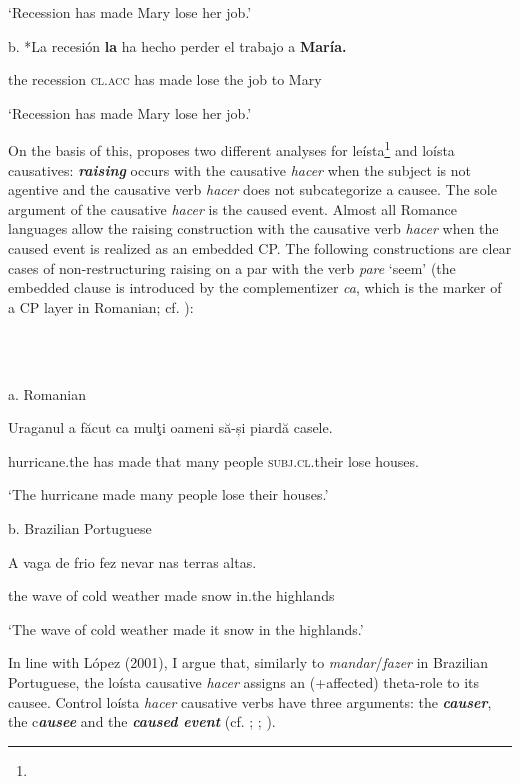 \documentclass[output=paper]{langsci/langscibook}
\begin{document}
‘Recession has made Mary lose her job.’

b.  *La recesión  \textbf{la}          ha  hecho perder el  trabajo  a  \textbf{María.}   

the  recession \textsc{cl.acc} has made  lose    the job       to Mary

‘Recession has made Mary lose her job.’

On the basis of this, \citet{Torrego2010} proposes two different analyses for leísta\footnote{} and loísta causatives: \textbf{\textit{raising}} occurs with the causative \textit{hacer} when the subject is not agentive and the causative verb \textit{hacer} does not subcategorize a causee. The sole argument of the causative \textit{hacer} is the caused event. Almost all Romance languages allow the raising construction with the causative verb \textit{hacer} when the caused event is realized as an embedded CP. The following constructions are clear cases of non-restructuring raising on a par with the verb \textit{pare} ‘seem’ (the embedded clause is introduced by the complementizer \textit{ca}, which is the marker of a CP layer in Romanian; cf. \citealt{Alboiu2007}):

\ea%
    \label{ex:key:8}
    \gll\\
        \\
    \glt
    \z

          a.  Romanian

Uraganul    a    făcut   ca   mulţi  oameni  să-și              piardă casele.   

    hurricane.the has made  that many people   \textsc{subj.cl}.their lose     houses. 

    ‘The hurricane made many people lose their houses.’

  b.  Brazilian Portuguese

A   vaga  de frio     fez   nevar   nas     terras altas.  

    the wave of cold weather   made  snow  in.the highlands

    ‘The wave of cold weather made it snow in the highlands.’    

In line with López (2001), I argue that, similarly to \textit{mandar}/\textit{fazer} in Brazilian Portuguese, the loísta causative \textit{hacer} assigns an (+affected) theta-role to its causee. Control loísta \textit{hacer} causative verbs have three arguments: the \textbf{\textit{causer}}, the c\textbf{\textit{ausee} }and the \textbf{\textit{caused event}} (cf. \citealt{Zubizarreta1985}; \citealt{Alsina1992}; \citealt{Ippolito2000}). 
\end{document}
